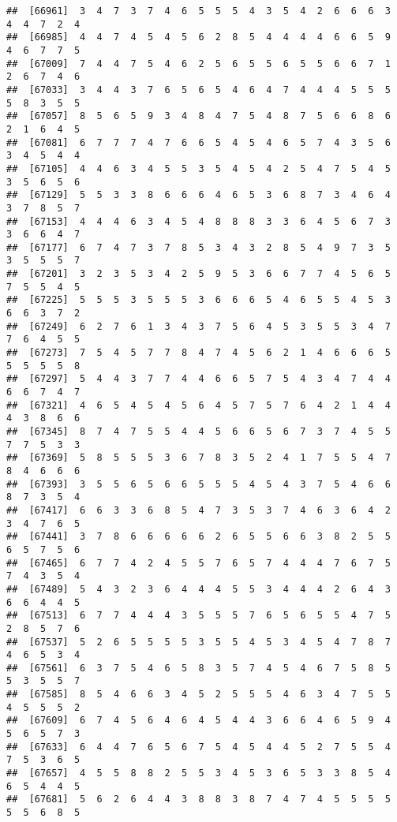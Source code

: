 \documentclass[
]{book}
\begin{document}
\begin{verbatim}
##  [66961]  3  4  7  3  7  4  6  5  5  5  4  3  5  4  2  6  6  6  3  4  4  7  2  4
##  [66985]  4  4  7  4  5  4  5  6  2  8  5  4  4  4  4  6  6  5  9  4  6  7  7  5
##  [67009]  7  4  4  7  5  4  6  2  5  6  5  5  6  5  5  6  6  7  1  2  6  7  4  6
##  [67033]  3  4  4  3  7  6  5  6  5  4  6  4  7  4  4  4  5  5  5  5  8  3  5  5
##  [67057]  8  5  6  5  9  3  4  8  4  7  5  4  8  7  5  6  6  8  6  2  1  6  4  5
##  [67081]  6  7  7  7  4  7  6  6  5  4  5  4  6  5  7  4  3  5  6  3  4  5  4  4
##  [67105]  4  4  6  3  4  5  5  3  5  4  5  4  2  5  4  7  5  4  5  3  5  6  5  6
##  [67129]  5  5  3  3  8  6  6  6  4  6  5  3  6  8  7  3  4  6  4  3  7  8  5  7
##  [67153]  4  4  4  6  3  4  5  4  8  8  8  3  3  6  4  5  6  7  3  3  6  6  4  7
##  [67177]  6  7  4  7  3  7  8  5  3  4  3  2  8  5  4  9  7  3  5  3  5  5  5  7
##  [67201]  3  2  3  5  3  4  2  5  9  5  3  6  6  7  7  4  5  6  5  7  5  5  4  5
##  [67225]  5  5  5  3  5  5  5  3  6  6  6  5  4  6  5  5  4  5  3  6  6  3  7  2
##  [67249]  6  2  7  6  1  3  4  3  7  5  6  4  5  3  5  5  3  4  7  7  6  4  5  5
##  [67273]  7  5  4  5  7  7  8  4  7  4  5  6  2  1  4  6  6  6  5  5  5  5  5  8
##  [67297]  5  4  4  3  7  7  4  4  6  6  5  7  5  4  3  4  7  4  4  6  6  7  4  7
##  [67321]  4  6  5  4  5  4  5  6  4  5  7  5  7  6  4  2  1  4  4  4  3  8  6  6
##  [67345]  8  7  4  7  5  5  4  4  5  6  6  5  6  7  3  7  4  5  5  7  7  5  3  3
##  [67369]  5  8  5  5  5  3  6  7  8  3  5  2  4  1  7  5  5  4  7  8  4  6  6  6
##  [67393]  3  5  5  6  5  6  6  5  5  5  4  5  4  3  7  5  4  6  6  8  7  3  5  4
##  [67417]  6  6  3  3  6  8  5  4  7  3  5  3  7  4  6  3  6  4  2  3  4  7  6  5
##  [67441]  3  7  8  6  6  6  6  6  2  6  5  5  6  6  3  8  2  5  5  6  5  7  5  6
##  [67465]  6  7  7  4  2  4  5  5  7  6  5  7  4  4  4  7  6  7  5  7  4  3  5  4
##  [67489]  5  4  3  2  3  6  4  4  4  5  5  3  4  4  4  2  6  4  3  6  6  4  4  5
##  [67513]  6  7  7  4  4  4  3  5  5  5  7  6  5  6  5  5  4  7  5  2  8  5  7  6
##  [67537]  5  2  6  5  5  5  5  3  5  5  4  5  3  4  5  4  7  8  7  4  6  5  3  4
##  [67561]  6  3  7  5  4  6  5  8  3  5  7  4  5  4  6  7  5  8  5  5  3  5  5  7
##  [67585]  8  5  4  6  6  3  4  5  2  5  5  5  4  6  3  4  7  5  5  4  5  5  5  2
##  [67609]  6  7  4  5  6  4  6  4  5  4  4  3  6  6  4  6  5  9  4  5  6  5  7  3
##  [67633]  6  4  4  7  6  5  6  7  5  4  5  4  4  5  2  7  5  5  4  7  5  3  6  5
##  [67657]  4  5  5  8  8  2  5  5  3  4  5  3  6  5  3  3  8  5  4  6  5  4  4  5
##  [67681]  5  6  2  6  4  4  3  8  8  3  8  7  4  7  4  5  5  5  5  5  5  6  8  5

\end{verbatim}
\end{document}
